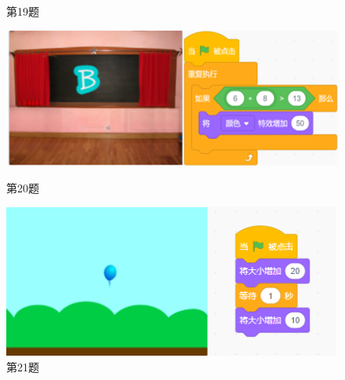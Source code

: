 \documentclass[10pt, a4paper]{article}
\begin{document}
\begin{enumerate}
\begin{figure}[htbp]
\begin{minipage}[t]{.36\textwidth}
\begin{minipage}[t]{.58\textwidth}
                \end{minipage}
                \caption*{第19题}
            \end{minipage}
            \begin{minipage}[t]{.32\textwidth}
                \centering
                \includegraphics[width=\textwidth]{20.png}
                \caption*{第20题}
            \end{minipage}
            \begin{minipage}[t]{.3\textwidth}
                \centering
                \includegraphics[width=\textwidth]{21.png}
                \caption*{第21题}
            \end{minipage}
        \end{figure}


\end{enumerate}
\end{document}
